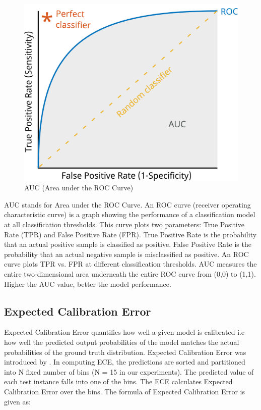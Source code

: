\begin{figure}[!htbp]
  \begin{center}
    \leavevmode
    \ifpdf
      \includegraphics[scale=0.4]
      {Chapter3/Chapter3Figs/AUC.png}    
    \fi
    \caption{AUC (Area under the ROC Curve)}
    \label{auc}
  \end{center}
\end{figure}

AUC stands for Area under the ROC Curve. An ROC curve (receiver operating characteristic curve) is a graph showing the performance of a classification model at all classification thresholds. This curve plots two parameters: True Positive Rate (TPR) and False Positive Rate (FPR). True Positive Rate is the probability that an actual positive sample is classified as positive. False Positive Rate is the probability that an actual negative sample is misclassified as positive. An ROC curve plots TPR vs. FPR at different classification thresholds. AUC measures the entire two-dimensional area underneath the entire ROC curve from (0,0) to (1,1). Higher the AUC value, better the model performance. 



\subsection{Expected Calibration Error}

Expected Calibration Error quantifies how well a given model is calibrated i.e how well the predicted output probabilities of the model matches the actual probabilities of the ground truth distribution. Expected Calibration Error was introduced by \cite{naeini2015obtaining}. In computing ECE, the predictions are sorted and partitioned into N fixed number of bins (N = 15 in our experiments). The predicted value of
each test instance falls into one of the bins. The ECE calculates Expected Calibration Error over the bins. The formula of Expected Calibration Error is given as:

